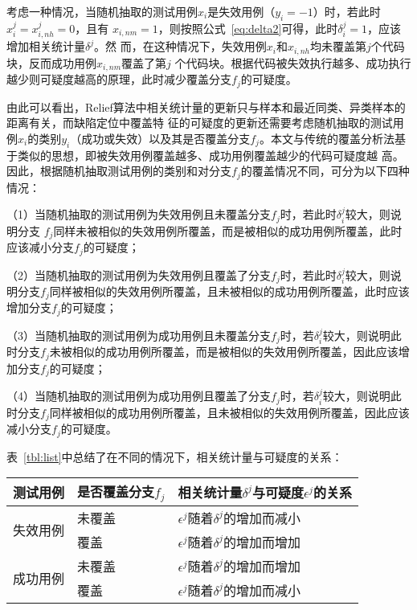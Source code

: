 考虑一种情况，当随机抽取的测试用例$x_i$是失效用例（$y_i=-1$）时，若此时$x_i^j=x_{i,nh}^j=0$，且有
$x_{i,nm}=1$，则按照公式~\eqref{eq:delta2}可得，此时$\delta_i^j=1$，应该增加相关统计量$\delta^j$。然
而，在这种情况下，失效用例$x_i$和$x_{i,nh}$均未覆盖第$j$个代码块，反而成功用例$x_{i,nm}$覆盖了第$j$
个代码块。根据代码被失效执行越多、成功执行越少则可疑度越高的原理，此时减少覆盖分支$f_j$的可疑度。

由此可以看出，Relief算法中相关统计量的更新只与样本和最近同类、异类样本的距离有关，而缺陷定位中覆盖特
征的可疑度的更新还需要考虑随机抽取的测试用例$x_i$的类别$y_i$（成功或失效）以及其是否覆盖分支$f_j$。本文与传统的覆盖分析法基于类似的思想，即被失效用例覆盖越多、成功用例覆盖越少的代码可疑度越
高。因此，根据随机抽取测试用例的类别和对分支$f_j$的覆盖情况不同，可分为以下四种情况：

（1）当随机抽取的测试用例为失效用例且未覆盖分支$f_j$时，若此时$\delta_i^j$较大，则说明分支
      $f_j$同样未被相似的失效用例所覆盖，而是被相似的成功用例所覆盖，此时应该减小分支$f_j$的可疑度；

（2）当随机抽取的测试用例为失效用例且覆盖了分支$f_j$时，若此时$\delta_i^j$较大，则说明分支$f_j$同样被相似的失效用例所覆盖，且未被相似的成功用例所覆盖，此时应该增加分支$f_j$的可疑度；

（3）当随机抽取的测试用例为成功用例且未覆盖分支$f_j$时，若$\delta_i^j$较大，则说明此时分支$f_j$未被相似的成功用例所覆盖，而是被相似的失效用例所覆盖，因此应该增加分支$f_j$的可疑度；

（4）当随机抽取的测试用例为成功用例且覆盖了分支$f_j$时，若$\delta_i^j$较大，则说明此时分支$f_j$同样被相似的成功用例所覆盖，且未被相似的失效用例所覆盖，因此应该减小分支$f_j$的可疑度。

表~\ref{tbl:list}中总结了在不同的情况下，相关统计量与可疑度的关系：
\begin{center}
\zihaowu
{}\label{tbl:list}
\begin{tabular}{lll}
\toprule
测试用例 & 是否覆盖分支$f_j$ & 相关统计量$\delta^j$与可疑度$\epsilon^j$的关系\\ \midrule
\multirow{2}{*}{失效用例} & 未覆盖 & $\epsilon^j$随着$\delta^j$的增加而减小\\
& 覆盖 & $\epsilon^j$随着$\delta^j$的增加而增加\\ \midrule
\multirow{2}{*}{成功用例} & 未覆盖 & $\epsilon^j$随着$\delta^j$的增加而增加\\
& 覆盖 & $\epsilon^j$随着$\delta^j$的增加而减小\\ 
\bottomrule
\end{tabular}
\end{center}

